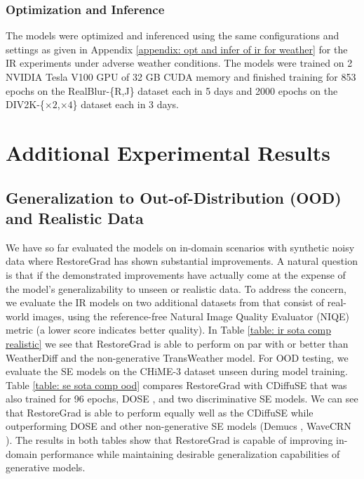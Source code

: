 \subsubsection{Optimization and Inference}
The models were optimized and inferenced using the same configurations and settings as given in Appendix \ref{appendix: opt and infer of ir for weather} for the IR experiments under adverse weather conditions. The models were trained on 2 NVIDIA Tesla V100 GPU of 32 GB CUDA memory and finished training for 853 epochs on the RealBlur-\{R,J\} dataset each in 5 days and 2000 epochs on the DIV2K-\{$\times2$,$\times4$\} dataset each in 3 days.


\section{Additional Experimental Results}
\label{sec: additional results}

\subsection{Generalization to Out-of-Distribution (OOD) and Realistic Data}
We have so far evaluated the models on in-domain scenarios with synthetic noisy data where RestoreGrad has shown substantial improvements. A natural question is that if the demonstrated improvements have actually come at the expense of the model's generalizability to unseen or realistic data. To address the concern,  we evaluate the IR models on two additional datasets from \citet{quan2021removing,liu2018desnownet} that consist of real-world images, using the reference-free Natural Image Quality Evaluator (NIQE) metric \citep{mittal2012making} (a lower score indicates better quality). In Table \ref{table: ir sota comp realistic} we see that RestoreGrad is able to perform on par with or better than WeatherDiff and the non-generative TransWeather model. For OOD testing, we evaluate the SE models on the CHiME-3 dataset \citep{barker2017third} unseen during model training. Table \ref{table: se sota comp ood} compares RestoreGrad with CDiffuSE that was also trained for 96 epochs, DOSE \citep{tai2024dose}, and two discriminative SE models. We can see that RestoreGrad is able to perform equally well as the CDiffuSE while outperforming DOSE and other non-generative SE models (Demucs \citep{defossez2020real}, WaveCRN \citep{hsieh2020wavecrn}). The results in both tables show that RestoreGrad is capable of improving in-domain performance while maintaining desirable generalization capabilities of generative models.

